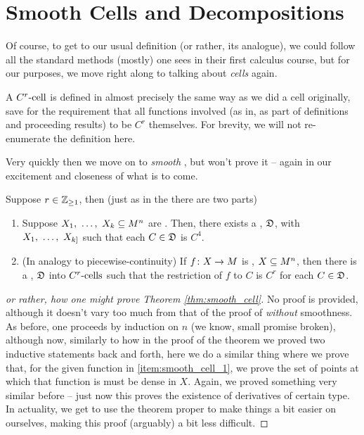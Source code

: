 
\section{Smooth Cells and Decompositions}

Of course, to get to our usual definition (or rather, its analogue), we could follow all the standard methods (mostly) one sees in their first calculus course, but for our purposes, we move right along to talking about \emph{cells} again.

\begin{definition}[$C^r$-cells]
A $\Crcell[r]$ is defined in almost precisely the same way as we did a cell originally, save for the requirement that all functions involved (as in, as part of definitions and proceeding results) to be $C^r$ themselves. For brevity, we will not re-enumerate the definition here.
\end{definition}

Very quickly then we move on to \emph{smooth} \cd, but won't prove it -- again in our excitement and closeness of what is to come.

\begin{theorem}
  Suppose $r \in \Zgeq{1}$, then (just as in the \CDt there are two parts)
    \begin{enumerate}
      \item \label{item:smooth_cell_1} Suppose $\vonevm{X}{k} \subseteq M^n$ are . Then, there exists a \cd, $\fancyD$, \cmptble with $\vonevm{X}{k]}$ such that each $C \in \fancyD$ is $C^4$.

      \item \label{item:smooth_cell_2} (In analogy to piecewise-continuity) If $\funcdom{f}{X}{M}$ is , $\XMn[X]{n}$, then there is a \cd, $\fancyD$ into $\Crcells$ such that the restriction of $f$ to $C$ is $C^r$ for each $C \in \fancyD$.
    \end{enumerate}

  \label{thm:smooth_cell}
\end{theorem}

\begin{proof}[or rather, how one might prove Theorem \ref{thm:smooth_cell}]
  No proof is provided, although it doesn't vary too much from that of the proof of \CD \emph{without} smoothness. As before, one proceeds by induction on $n$ (we know, small promise broken), although now, similarly to how in the proof of the \CD theorem we proved two inductive statements back and forth, here we do a similar thing where we prove that, for the given function in \ref {item:smooth_cell_1}, we prove the set of points at which that function is \cont must be dense in $X$. Again, we proved something very similar before -- just now this proves the existence of derivatives of certain type. In actuality, we get to use the \CD theorem proper to make things a bit easier on ourselves, making this proof (arguably) a bit less difficult.
\end{proof}


